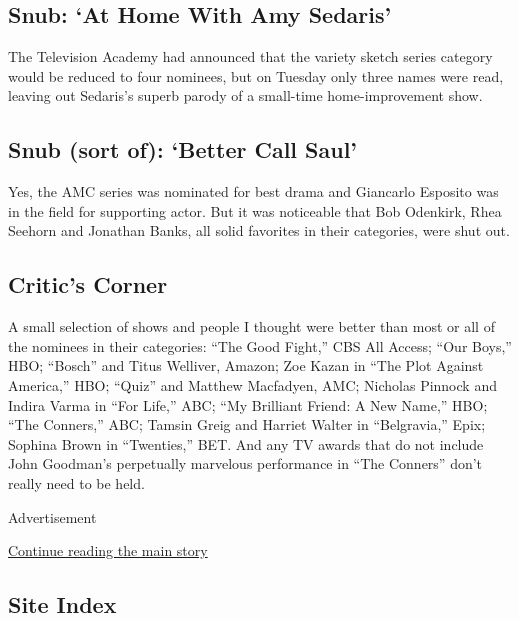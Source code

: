 \hypertarget{snub-at-home-with-amy-sedaris}{%
\subsection{Snub: `At Home With Amy
Sedaris'}\label{snub-at-home-with-amy-sedaris}}

The Television Academy had announced that the variety sketch series
category would be reduced to four nominees, but on Tuesday only three
names were read, leaving out Sedaris's superb parody of a small-time
home-improvement show.

\hypertarget{snub-sort-of-better-call-saul}{%
\subsection{Snub (sort of): `Better Call
Saul'}\label{snub-sort-of-better-call-saul}}

Yes, the AMC series was nominated for best drama and Giancarlo Esposito
was in the field for supporting actor. But it was noticeable that Bob
Odenkirk, Rhea Seehorn and Jonathan Banks, all solid favorites in their
categories, were shut out.

\hypertarget{critics-corner}{%
\subsection{Critic's Corner}\label{critics-corner}}

A small selection of shows and people I thought were better than most or
all of the nominees in their categories: ``The Good Fight,'' CBS All
Access; ``Our Boys,'' HBO; ``Bosch'' and Titus Welliver, Amazon; Zoe
Kazan in ``The Plot Against America,'' HBO; ``Quiz'' and Matthew
Macfadyen, AMC; Nicholas Pinnock and Indira Varma in ``For Life,'' ABC;
``My Brilliant Friend: A New Name,'' HBO; ``The Conners,'' ABC; Tamsin
Greig and Harriet Walter in ``Belgravia,'' Epix; Sophina Brown in
``Twenties,'' BET. And any TV awards that do not include John Goodman's
perpetually marvelous performance in ``The Conners'' don't really need
to be held.

Advertisement

\protect\hyperlink{after-bottom}{Continue reading the main story}

\hypertarget{site-index}{%
\subsection{Site Index}\label{site-index}}

